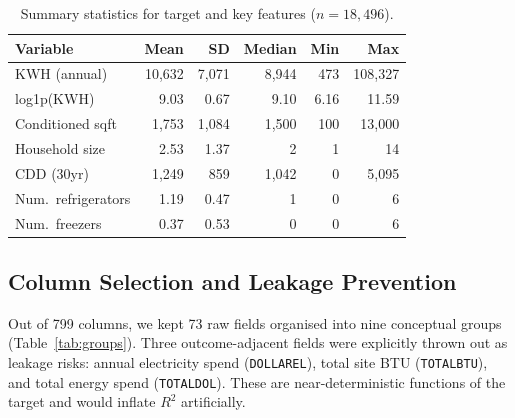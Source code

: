 \documentclass[10pt,twocolumn]{article}
\begin{document}
\begin{table}[H]
\centering
\caption{Summary statistics for target and key features ($n = 18{,}496$).}
\label{tab:summary}
\small
\setlength{\tabcolsep}{3pt}
\begin{tabular}{@{}lrrrrr@{}}
\toprule
\textbf{Variable} & \textbf{Mean} & \textbf{SD} & \textbf{Median} & \textbf{Min} & \textbf{Max}\\
\midrule
KWH (annual)        & 10{,}632 & 7{,}071 & 8{,}944 & 473 & 108{,}327\\
log1p(KWH)          & 9.03 & 0.67 & 9.10 & 6.16 & 11.59\\
Conditioned sqft    & 1{,}753 & 1{,}084 & 1{,}500 & 100 & 13{,}000\\
Household size      & 2.53 & 1.37 & 2 & 1 & 14\\
CDD (30yr)          & 1{,}249 & 859 & 1{,}042 & 0 & 5{,}095\\
Num.\ refrigerators & 1.19 & 0.47 & 1 & 0 & 6\\
Num.\ freezers      & 0.37 & 0.53 & 0 & 0 & 6\\
\bottomrule
\end{tabular}
\end{table}

\subsection{Column Selection and Leakage Prevention}

Out of 799 columns, we kept 73 raw fields organised into nine conceptual groups (Table~\ref{tab:groups}). Three outcome-adjacent fields were explicitly thrown out as leakage risks: annual electricity spend (\texttt{DOLLAREL}), total site BTU (\texttt{TOTALBTU}), and total energy spend (\texttt{TOTALDOL}). These are near-deterministic functions of the target and would inflate $R^2$ artificially.
\end{document}
